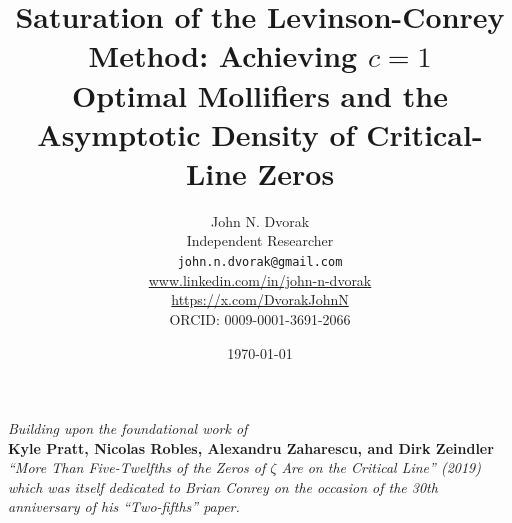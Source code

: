 \documentclass[11pt]{article}
\title{Saturation of the Levinson-Conrey Method: Achieving $c = 1$\\
\large Optimal Mollifiers and the Asymptotic Density of Critical-Line Zeros}
\author{John N. Dvorak \\
\small Independent Researcher \\
\small \texttt{john.n.dvorak@gmail.com} \\
\small \url{www.linkedin.com/in/john-n-dvorak} \\
\small \url{https://x.com/DvorakJohnN} \\
\small ORCID: 0009-0001-3691-2066}
\date{\today}
\begin{document}
\maketitle

\begin{center}
\textit{Building upon the foundational work of}\\[3pt]
\textbf{Kyle Pratt, Nicolas Robles, Alexandru Zaharescu, and Dirk Zeindler}\\[3pt]
\textit{``More Than Five-Twelfths of the Zeros of $\zeta$ Are on the Critical Line'' (2019)}\\[6pt]
\textit{which was itself dedicated to Brian Conrey on the occasion of the 30th anniversary of his ``Two-fifths'' paper.}
\end{center}

\vspace{1em}
\end{document}
